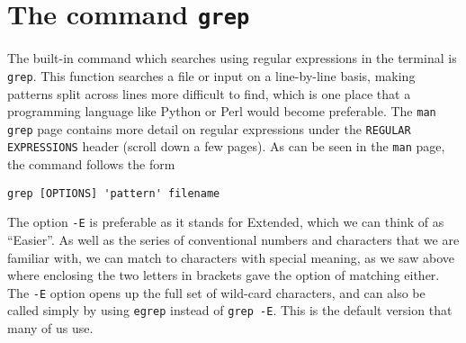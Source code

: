 
\section{The command \texttt{grep}}
The built-in command which searches using regular expressions in the terminal is \texttt{grep}.
This function searches a file or input on a line-by-line basis, making patterns split across lines more difficult to find, which is one place that a programming language like Python or Perl would become preferable.  
The \texttt{man grep} page contains more detail on regular expressions under the \texttt{REGULAR EXPRESSIONS} header (scroll down a few pages).  
As can be seen in the \texttt{man} page, the command follows the form
\begin{lstlisting}[style=command_syntax]
grep [OPTIONS] 'pattern' filename
\end{lstlisting}
The option \texttt{-E} is preferable as it stands for Extended, which we can think of as ``Easier''.
As well as the series of conventional numbers and characters that we are familiar with, we can match to characters with special meaning, as we saw above where enclosing the two letters in brackets gave the option of matching either. 
The \texttt{-E} option opens up the full set of wild-card characters, and can also be called simply by using \texttt{egrep} instead of \texttt{grep -E}.
This is the default version that many of us use.\\

